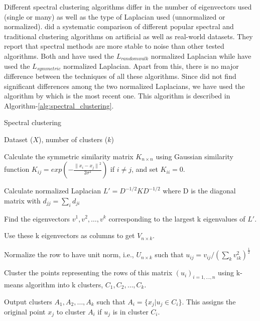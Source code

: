 Different spectral clustering algorithms differ in the number of eigenvectors used (single or many) as well as the type of Laplacian used (unnormalized or normalized). \citet{verma2003comparison} did a systematic comparison of different popular spectral \citep{shi00normalized, ng2001onspectral, meila2000learning} and traditional clustering algorithms on artificial as well as real-world datasets. They report that spectral methods are more stable to noise than other tested algorithms. Both \citet{shi00normalized} and \citet{meila2000learning} have used the $L_{random walk}$ normalized Laplacian while \citet{ng2001onspectral} have used the $L_{symmetric}$ normalized Laplacian. Apart from this, there is no major difference between the techniques of all these algorithms. Since \citet{verma2003comparison} did not find significant differences among the two normalized Laplacians, we have used the algorithm by \citet{ng2001onspectral} which is the most recent one. This algorithm is described in Algorithm-\ref{alg:spectral_clustering}.
\begin{algorithm}
\caption{Spectral clustering}
\label{alg:spectral_clustering}
\begin{algorithmic}[1]
\REQUIRE Dataset ($X$), number of clusters ($k$) 

\STATE Calculate the symmetric similarity matrix $K_{n \times n}$  using Gaussian similarity function  $K_{ij}=exp \left( -\frac{{\parallel x_{i}-x_{j} \parallel}^{2}}{2\sigma^{2}}\right)$ if $i\neq j$, and set $K_{ii}=0$. 

\STATE Calculate normalized Laplacian $L'=D^{-1/2}KD^{-1/2}$ where D is the diagonal matrix with $d_{jj}=\sum_{i}d_{ji}$ 

\STATE Find the eigenvectors $v^{1},v^{2},\dots,v^{k}$ corresponding to the largest k eigenvalues of $L'$. 

\STATE Use these k eigenvectors as columns to get $V_{n \times k}$. 

\STATE Normalize the row to have unit norm, i.e., $U_{n \times k}$ such that $u_{ij}= v_{ij}/(\sum_{k}{v_{ik}^{2}})^{\frac{1}{2}}$

\STATE Cluster the points representing the rows of this matrix $(u_{i})_{i=1,...,n}$ using k-means algorithm into k clusters, $C_{1},C_{2},\dots,C_{k}$.  

\STATE Output clusters $A_{1},A_{2},\dots,A_{k}$ such that $A_{i}=\{x_{j}|u_{j}\in C_{i}\}$. This assigns the original point $x_{j}$ to cluster $A_{i}$ if $u_{j}$ is in cluster $C_{i}$. 

\end{algorithmic}
\end{algorithm}

